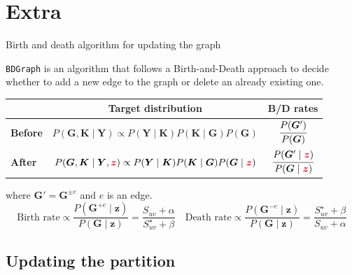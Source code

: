 \section{Extra}

\begin{frame}{Birth and death algorithm for updating the graph}

    \texttt{BDGraph} is an algorithm that follows a Birth-and-Death approach to decide whether to \alert{add} a new edge to the graph or \alert{delete} an already existing one.

    \pause
    
    \begin{table}[tb]
        \centering
        \begin{tabular}{lcc}
        \toprule
        & Target distribution & B/D rates \\
        \hline
        \textbf{Before} & $P(\bm{G},\bm{K} \mid \bm{Y}) \propto P(\bm{Y} \mid \bm{K})P (\bm{K} \mid \bm{G})P(\bm{G})$ & $\cfrac{P(\bm{G}')}{P(\bm{G})}$ \\
        \textbf{After}  & $P(\bm{G},\bm{K} \mid \bm{Y}, \textcolor{sleekRed}{\bm{z}}) \propto P(\bm{Y} \mid \bm{K})P(\bm{K} \mid \bm{G})P(\bm{G} \mid \textcolor{sleekRed}{\bm{z}})$ & $\cfrac{P(\bm{G}' \mid \textcolor{sleekRed}{\bm{z}})}{P(\bm{G} \mid \textcolor{sleekRed}{\bm{z}})}$ \\
        \bottomrule
        \end{tabular}
    \end{table}
    where $\bm{G}' = \bm{G}^{\pm e}$ and $e$ is an edge.
    \pause
    \[
        \text{Birth rate} \propto \frac{P(\bm{G}^{+ e}\mid \bm{z})}{P(\bm{G}\mid \bm{z})} = \frac{S_{uv} + \alpha}{S^{\star}_{uv} + \beta}
        \quad
        \text{Death rate} \propto \frac{P(\bm{G}^{- e}\mid \bm{z})}{P(\bm{G}\mid \bm{z})} = \frac{S^{\star}_{uv} + \beta}{S_{uv} + \alpha}
    \]
    
\end{frame}

\subsection{Updating the partition}

